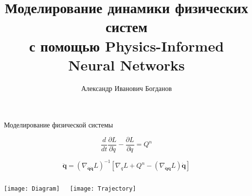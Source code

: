 \documentclass{beamer}
\title[\hbox to 56mm{Моделирование динамики физических систем}]{Моделирование динамики физических систем\\ с помощью Physics-Informed Neural Networks}
\author[А.\,И.~Богданов]{Александр Иванович Богданов}
\institute{Московский физико-технический институт}
\date{\footnotesize
\par\smallskip\emph{Курс:} Моя первая научная статья
\par\smallskip\emph{Консультант:} К.\,К.~Панченко
\par\bigskip\small 2023}
\begin{document}

\begin{frame}

    \thispagestyle{empty}
    \maketitle
    
\end{frame}


\begin{comment}
\begin{frame}{Цель исследования}
\end{frame}
\end{comment}


\begin{frame}{Моделирование физической системы}

    $$\frac{d}{dt} \frac{\partial L}{\partial \dot{q}} - \frac{\partial L}{\partial q} = Q^n$$
    
    $$\mathbf{\ddot{q}} = \left( \nabla_{\dot{\mathbf{q}} \dot{\mathbf{q}}} L\right)^{-1} \left[ \nabla_{q} L + Q^n - \left( \nabla_{\dot{\mathbf{q}} \mathbf{q}} L \right) \dot{\mathbf{q}} \right]$$

    \bigskip

    \begin{columns}[c]

            \texttt{[image: Diagram]}

            \texttt{[image: Trajectory]} 
            
    \end{columns}

\end{frame}
\end{document}
